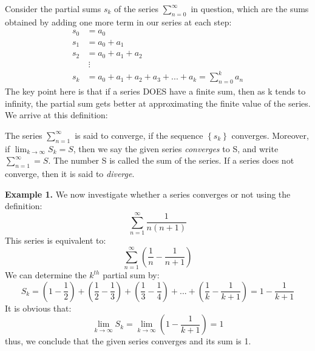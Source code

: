 \documentclass{article}
\begin{document}
Consider the partial sums $s_k$ of the series $\sum_{n=0}^{\infty} $ in question, which are the sums obtained by adding one more term in our series at each step:
\begin{align*}
    s_0 &= a_0 \\
    s_1 &= a_0 + a_1 \\
    s_2 &= a_0 + a_1 + a_2 \\
    &\ \vdots \\
    s_k &= a_0 + a_1 + a_2 + a_3 + ... + a_k = \sum_{n=0}^{k} a_n
\end{align*}
The key point here is that if a series DOES have a finite sum, then as k tends to infinity, the partial sum gets better at approximating the finite value of the series. We arrive at this definition: 
\newline
\begin{mdframed}
The series $\sum_{n=1}^{\infty}$ is said to converge, if the sequence $\left\{s_k \right\}$ converges. Moreover, if  $\lim_{k\to\infty} S_k = S$, then we say the given series \textit{converges} to S, and write $\sum_{n=1}^{\infty}=S$. The number S is called the sum of the series. If a series does not converge, then it is said to \textit{diverge}.
\end{mdframed} 
\textbf{Example 1.} We now investigate whether a series converges or not using the definition: 
$$\sum_{n=1}^{\infty} \frac{1}{n(n+1)}$$
This series is equivalent to: 
$$\sum_{n=1}^{\infty} \left(\frac{1}{n} - \frac{1}{n+1}\right)$$
We can determine the $k^{th}$ partial sum by:
$$S_k = \left(1-\frac{1}{2}\right) + \left(\frac{1}{2} - \frac{1}{3}\right) + \left(\frac{1}{3} - \frac{1}{4}\right) + ... + \left(\frac{1}{k} - \frac{1}{k+1}\right) = 1 - \frac{1}{k+1}$$
It is obvious that: $$\lim_{k\to\infty} S_k = \lim_{k\to\infty} \left(1 - \frac{1}{k+1}\right) = 1 $$
thus, we conclude that the given series converges and its sum is 1.
\end{document}
